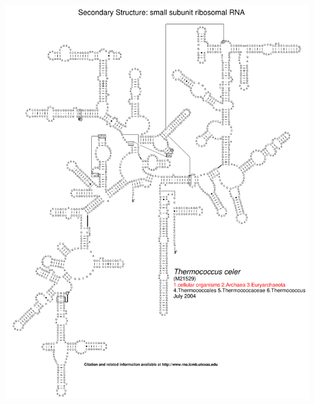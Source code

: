 \documentclass[landscape]{slides}
\begin{document}
\begin{slide}\begin{center}\includegraphics[height=8in]{figs/arc-24}\end{center}\vfill\end{slide}
\end{document}
